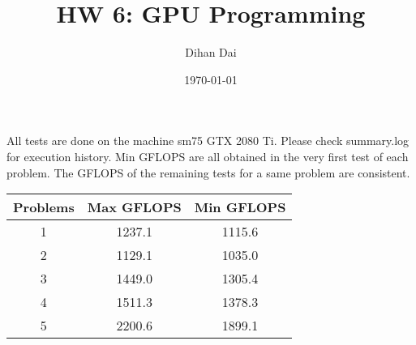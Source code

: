 \documentclass[11pt]{amsart}
\title{HW 6: GPU Programming}
\author{Dihan Dai}
\date{\today}
\begin{document}
\maketitle
All tests are done on the machine sm75 GTX 2080 Ti. Please check summary.log for execution history. Min GFLOPS are all obtained in the very first test of each problem. The GFLOPS of the remaining tests for a same problem are consistent.
\begin{center}
\begin{tabular}{|c|c|c|}
\hline
Problems& Max GFLOPS& Min GFLOPS\\
\hline
1 & 1237.1& 1115.6\\
\hline
2 & 1129.1& 1035.0\\
\hline
3 & 1449.0& 1305.4\\
\hline
4 & 1511.3& 1378.3\\
\hline
5 & 2200.6& 1899.1\\
\hline
\end{tabular}
\end{center}
\end{document}
